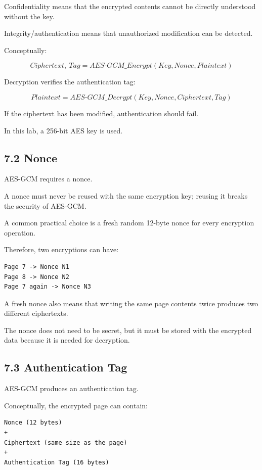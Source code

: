 \documentclass[12pt,a4paper]{article}
\begin{document}
Confidentiality means that the encrypted contents cannot be directly understood without the key.

Integrity/authentication means that unauthorized modification can be detected.

Conceptually:

\[
Ciphertext,\ Tag
=
AES\text{-}GCM\_Encrypt(Key, Nonce, Plaintext)
\]

Decryption verifies the authentication tag:

\[
Plaintext
=
AES\text{-}GCM\_Decrypt(Key, Nonce, Ciphertext, Tag)
\]

If the ciphertext has been modified, authentication should fail.

In this lab, a 256-bit AES key is used.

\subsection{7.2 Nonce}

AES-GCM requires a nonce.

A nonce must never be reused with the same encryption key; reusing it breaks the security of AES-GCM.

A common practical choice is a fresh random 12-byte nonce for every encryption operation.

Therefore, two encryptions can have:

\begin{verbatim}
Page 7 -> Nonce N1
Page 8 -> Nonce N2
Page 7 again -> Nonce N3
\end{verbatim}

A fresh nonce also means that writing the same page contents twice produces two different ciphertexts.

The nonce does not need to be secret, but it must be stored with the encrypted data because it is needed for decryption.

\subsection{7.3 Authentication Tag}

AES-GCM produces an authentication tag.

Conceptually, the encrypted page can contain:

\begin{verbatim}
Nonce (12 bytes)
+
Ciphertext (same size as the page)
+
Authentication Tag (16 bytes)
\end{verbatim}
\end{document}
